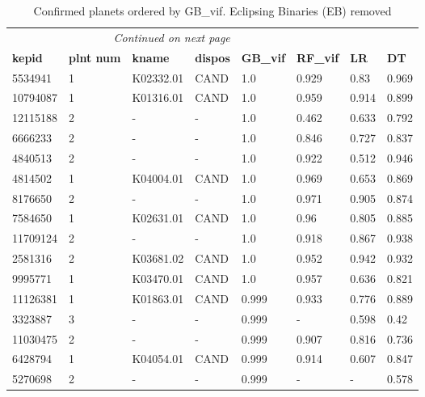 \begin{longtable}[!htbp]
{| 
 p{}| 
 p{}| 
 p{}| 
 p{}| 
 p{}| 
 p{}| 
 p{}| 
 p{}| 
}\caption{Confirmed planets ordered by GB\_vif. Eclipsing Binaries (EB) removed}\\    %
\hline
\endhead
\hline \multicolumn{4}{r}{\textit{Continued on next page}} \\
\endfoot
\hline
\textbf{kepid} &\textbf{plnt num} &\textbf{kname} &\textbf{dispos} &\textbf{GB\_vif} &\textbf{RF\_vif} &\textbf{LR} &\textbf{DT} \\ \hline 
5534941 &1 &K02332.01 &CAND &1.0 &0.929 &0.83 &0.969 \\ \hline 
10794087 &1 &K01316.01 &CAND &1.0 &0.959 &0.914 &0.899 \\ \hline 
12115188 &2 &- &- &1.0 &0.462 &0.633 &0.792 \\ \hline 
6666233 &2 &- &- &1.0 &0.846 &0.727 &0.837 \\ \hline 
4840513 &2 &- &- &1.0 &0.922 &0.512 &0.946 \\ \hline 
4814502 &1 &K04004.01 &CAND &1.0 &0.969 &0.653 &0.869 \\ \hline 
8176650 &2 &- &- &1.0 &0.971 &0.905 &0.874 \\ \hline 
7584650 &1 &K02631.01 &CAND &1.0 &0.96 &0.805 &0.885 \\ \hline 
11709124 &2 &- &- &1.0 &0.918 &0.867 &0.938 \\ \hline 
2581316 &2 &K03681.02 &CAND &1.0 &0.952 &0.942 &0.932 \\ \hline 
9995771 &1 &K03470.01 &CAND &1.0 &0.957 &0.636 &0.821 \\ \hline 
11126381 &1 &K01863.01 &CAND &0.999 &0.933 &0.776 &0.889 \\ \hline 
3323887 &3 &- &- &0.999 &- &0.598 &0.42 \\ \hline 
11030475 &2 &- &- &0.999 &0.907 &0.816 &0.736 \\ \hline 
6428794 &1 &K04054.01 &CAND &0.999 &0.914 &0.607 &0.847 \\ \hline 
5270698 &2 &- &- &0.999 &- &- &0.578 \\ \hline 

\end{longtable}
